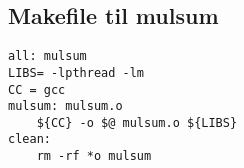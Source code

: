 \subsection{Makefile til mulsum}
\begin{lstlisting}
all: mulsum
LIBS= -lpthread -lm
CC = gcc
mulsum: mulsum.o
	${CC} -o $@ mulsum.o ${LIBS}
clean:
	rm -rf *o mulsum

\end{lstlisting}